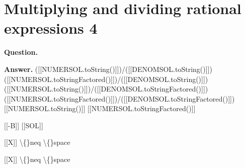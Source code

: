 \documentclass{article}
\begin{document}
\section*{Multiplying and dividing rational expressions 4}
\textbf{Question.} 

\textbf{Answer.} ([[NUMERSOL.toString()]])/([[DENOMSOL.toString()]])
                ([[NUMERSOL.toStringFactored()]])/([[DENOMSOL.toString()]])
                ([[NUMERSOL.toString()]])/([[DENOMSOL.toStringFactored()]])
                ([[NUMERSOL.toStringFactored()]])/([[DENOMSOL.toStringFactored()]])
                [[NUMERSOL.toString()]]
                [[NUMERSOL.toStringFactored()]]
            

            
                [[-B]]
                [[SOL]]
                
                    [[X]] \textbackslash\{\}neq \textbackslash\{\}space
                    
                        [[X]] \textbackslash\{\}neq \textbackslash\{\}space
\end{document}
